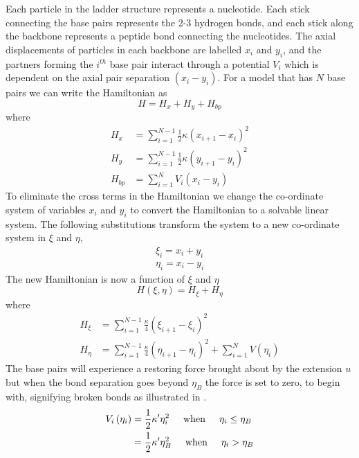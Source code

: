 Each particle in the ladder structure represents a nucleotide. Each stick connecting the base pairs represents the 2-3 hydrogen bonds, and each stick along the backbone represents a peptide bond connecting the nucleotides. The axial displacements of particles in each backbone are labelled $x_i$ and $y_i$, and the partners forming the $i^{th}$ base pair interact through a potential $V_{i}$ which is dependent on the axial pair separation $(x_{i}-y_{i})$. For a model that has $N$ base pairs we can write the Hamiltonian as
%
\begin{equation}
\label{dna_hamiltonian}
H = H_{x} + H_{y} + H_{bp}
\end{equation}
%
where
%
\begin{align}
\label{dna_hamiltonian_x}
H_{x} &= \sum_{i=1}^{N-1} \frac{1}{2} \kappa \left(x_{i+1}-x_{i} \right)^2 \\
\label{dna_hamiltonian_y}
H_{y} &= \sum_{i=1}^{N-1} \frac{1}{2} \kappa \left(y_{i+1}-y_{i} \right)^2 \\
\label{dna_hamiltonian_bp}
H_{bp} &= \sum_{i=1}^{N}V_{i}\left(x_{i}-y_{i}\right)
\end{align}
%
To eliminate the cross terms in the Hamiltonian we change the co-ordinate system of variables $x_{i}$ and $y_{i}$ to convert the Hamiltonian to a solvable linear system. The following substitutions transform the system to a new co-ordinate system in $\xi$ and $\eta$,
%
\begin{align}
\label{dna_transform_xi}
\xi_{i}=x_{i}+y_{i}\\
\label{dna_transform_eta}
\eta_{i}=x_{i}-y_{i}
\end{align}
%
The new Hamiltonian is now a function of $\xi$ and $\eta$
%
\begin{equation}
\label{dna_hamiltonian_xi_eta}
H\left(\xi,\eta\right) = H_{\xi} + H_{\eta} 
\end{equation}
%
where
%
\begin{align}
\label{dna_hamiltonian_xi}
H_{\xi} &= \sum_{i=1}^{N-1} \frac{\kappa}{4} \left(\xi_{i+1}-\xi_{i} \right)^2 \\
\label{dna_hamiltonian_eta}
H_{\eta} &= \sum_{i=1}^{N-1} \frac{\kappa}{4} \left(\eta_{i+1}-\eta_{i} \right)^2 + \sum_{i=1}^{N} V\left(\eta_{i}\right)
\end{align}
%
The base pairs will experience a restoring force brought about by the extension $u$ but when the bond separation goes beyond $\eta_{B}$ the force is set to zero, to begin with, signifying broken bonds as illustrated in . 
%
\begin{align}\label{dna_pair_potential}
V_{i}\left(\eta_{i}\right)&=\frac{1}{2}\kappa'\eta_{i}^{2} \text{\hspace{5 mm}when\hspace{5 mm}}\eta_{i} \leq \eta_{B} \\
&=\frac{1}{2}\kappa'\eta_{B}^{2} \text{\hspace{5 mm}when\hspace{5 mm}}\eta_{i} > \eta_{B}\nonumber
\end{align}
